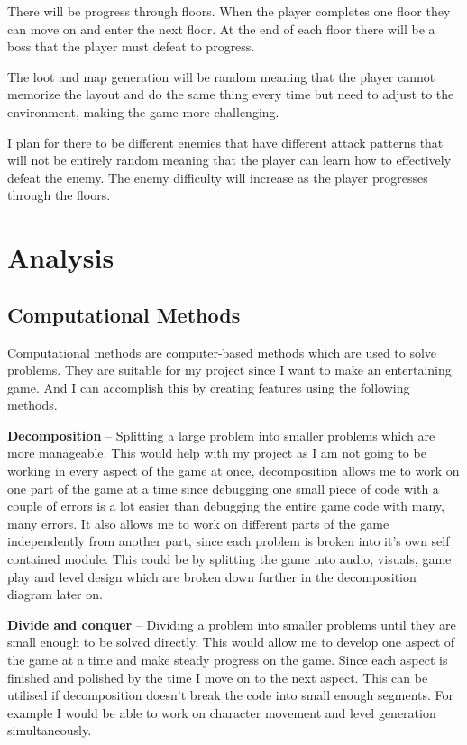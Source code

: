 \documentclass{article}
\newcommand{\parBr}{\vspace{5mm}}%
\begin{document}
\parBr

There will be progress through floors. When the player completes one floor they can move on and enter the next floor. At the end of each floor there will be a boss that the player must defeat to progress.

\parBr

The loot and map generation will be random meaning that the player cannot memorize the layout and do the same thing every time but need to adjust to the environment, making the game more challenging.

\parBr

I plan for there to be different enemies that have different attack patterns that will not be entirely random meaning that the player can learn how to effectively defeat the enemy. The enemy difficulty will increase as the player progresses through the floors.

\section{Analysis}
\subsection{Computational Methods}
Computational methods are computer-based methods which are used to solve problems. They are suitable for my project since I want to make an entertaining game. And I can accomplish this by creating features using the following methods.

\parBr

\textbf{Decomposition} – Splitting a large problem into smaller problems which are more manageable. This would help with my project as I am not going to be working in every aspect of the game at once, decomposition allows me to work on one part of the game at a time since debugging one small piece of code with a couple of errors is a lot easier than debugging the entire game code with many, many errors. It also allows me to work on different parts of the game independently from another part, since each problem is broken into it's own self contained module. This could be by splitting the game into audio, visuals, game play and level design which are broken down further in the decomposition diagram later on.

\parBr

\textbf{Divide and conquer} – Dividing a problem into smaller problems until they are small enough to be solved directly. This would allow me to develop one aspect of the game at a time and make steady progress on the game. Since each aspect is finished and polished by the time I move on to the next aspect. This can be utilised if decomposition doesn't break the code into small enough segments. For example I would be able to work on character movement and level generation simultaneously.
\end{document}
